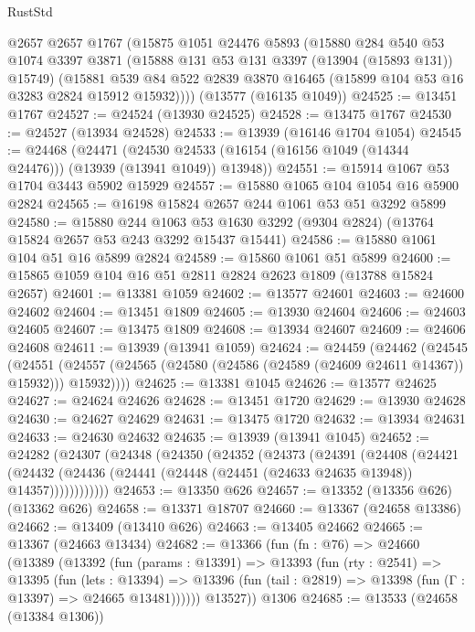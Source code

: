 \begin{lexlean}{RustStd}
\begin{coremodule}
    @2657
    @2657
    @1767
    (@15875
      @1051
      @24476
      @5893
      (@15880
        @284
        @540
        @53
        @1074
        @3397
        @3871
        (@15888 @131 @53 @131 @3397 (@13904 (@15893 @131)) @15749)
        (@15881 @539 @84 @522 @2839 @3870 @16465 (@15899 @104 @53 @16 @3283 @2824 @15912 @15932))))
    (@13577 (@16135 @1049))
@24525 := @13451 @1767
@24527 := @24524 (@13930 @24525)
@24528 := @13475 @1767
@24530 := @24527 (@13934 @24528)
@24533 := @13939 (@16146 @1704 @1054)
@24545 := @24468
    (@24471 (@24530 @24533 (@16154 (@16156 @1049 (@14344 @24476))) (@13939 (@13941 @1049)) @13948))
@24551 := @15914 @1067 @53 @1704 @3443 @5902 @15929
@24557 := @15880 @1065 @104 @1054 @16 @5900 @2824
@24565 := @16198 @15824 @2657 @244 @1061 @53 @51 @3292 @5899
@24580 := @15880
    @244
    @1063
    @53
    @1630
    @3292
    (@9304 @2824)
    (@13764 @15824 @2657 @53 @243 @3292 @15437 @15441)
@24586 := @15880 @1061 @104 @51 @16 @5899 @2824
@24589 := @15860 @1061 @51 @5899
@24600 := @15865 @1059 @104 @16 @51 @2811 @2824 @2623 @1809 (@13788 @15824 @2657)
@24601 := @13381 @1059
@24602 := @13577 @24601
@24603 := @24600 @24602
@24604 := @13451 @1809
@24605 := @13930 @24604
@24606 := @24603 @24605
@24607 := @13475 @1809
@24608 := @13934 @24607
@24609 := @24606 @24608
@24611 := @13939 (@13941 @1059)
@24624 := @24459
    (@24462
      (@24545
        (@24551 (@24557 (@24565 (@24580 (@24586 (@24589 (@24609 @24611 @14367)) @15932))) @15932))))
@24625 := @13381 @1045
@24626 := @13577 @24625
@24627 := @24624 @24626
@24628 := @13451 @1720
@24629 := @13930 @24628
@24630 := @24627 @24629
@24631 := @13475 @1720
@24632 := @13934 @24631
@24633 := @24630 @24632
@24635 := @13939 (@13941 @1045)
@24652 := @24282
    (@24307
      (@24348
        (@24350
          (@24352
            (@24373
              (@24391
                (@24408
                  (@24421
                    (@24432
                      (@24436 (@24441 (@24448 (@24451 (@24633 @24635 @13948)) @14357))))))))))))
@24653 := @13350 @626
@24657 := @13352 (@13356 @626) (@13362 @626)
@24658 := @13371 @18707
@24660 := @13367 (@24658 @13386)
@24662 := @13409 (@13410 @626)
@24663 := @13405 @24662
@24665 := @13367 (@24663 @13434)
@24682 := @13366
    (fun (fn : @76) =>
    @24660
      (@13389
        (@13392
          (fun (params : @13391) =>
          @13393
            (fun (rty : @2541) =>
            @13395
              (fun (lets : @13394) =>
              @13396 (fun (tail : @2819) => @13398 (fun (Γ : @13397) => @24665 @13481))))))
        @13527))
    @1306
@24685 := @13533 (@24658 (@13384 @1306))

\end{coremodule}
\end{lexlean}
